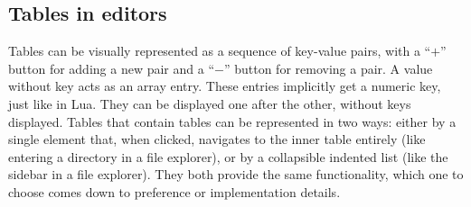 \subsection{Tables in editors}
Tables can be visually represented as a sequence of key-value pairs, with a ``$+$'' button for adding a new pair and a ``$-$'' button for removing a pair. A value without key acts as an array entry. These entries implicitly get a numeric key, just like in Lua. They can be displayed one after the other, without keys displayed. Tables that contain tables can be represented in two ways: either by a single element that, when clicked, navigates to the inner table entirely (like entering a directory in a file explorer), or by a collapsible indented list (like the sidebar in a file explorer). They both provide the same functionality, which one to choose comes down to preference or implementation details.
